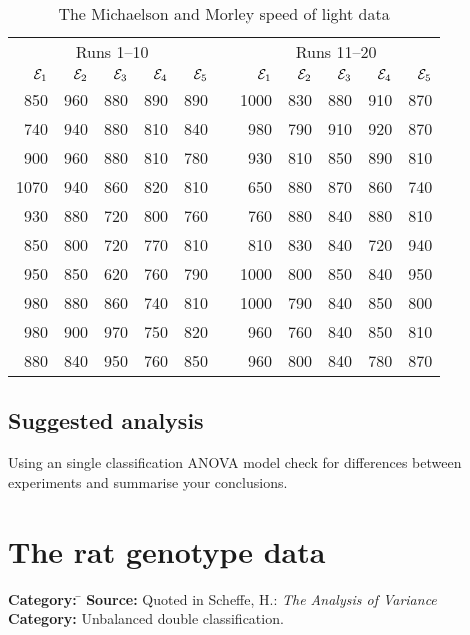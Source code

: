 \documentclass{article}
\newcommand{\strutt}{\vrule height 2.5ex depth 0.5ex width 0ex}%
\begin{document}
\begin{table}[ht]
\begin{center}
\begin{tabular}{|rrrrr|c@{\protect\strutt}|rrrrr|}
 \cline{1-5} \cline{7-11}
\multicolumn{5}{|c|}{Runs 1--10}&\hspace*{1cm}&\multicolumn{5}{c|}{Runs
11--20}\\
      ${\cal E}_1$ &    ${\cal E}_2$ &    ${\cal E}_3$ &    ${\cal E}_4$ &
      ${\cal E}_5$ &&    ${\cal E}_1$ &    ${\cal E}_2$ &    ${\cal E}_3$ &
      ${\cal E}_4$ &    ${\cal E}_5$\\
 \cline{1-5} \cline{7-11}
    850 &  960 &  880 &  890 &  890 && 1000 &  830 &  880 &  910 &  870\\
    740 &  940 &  880 &  810 &  840 && 980 &  790 &  910 &  920 &  870\\
    900 &  960 &  880 &  810 &  780 && 930 &  810 &  850 &  890 &  810\\
   1070 &  940 &  860 &  820 &  810 && 650 &  880 &  870 &  860 &  740\\
    930 &  880 &  720 &  800 &  760 && 760 &  880 &  840 &  880 &  810\\
    850 &  800 &  720 &  770 &  810 && 810 &  830 &  840 &  720 &  940\\
    950 &  850 &  620 &  760 &  790 &&1000 &  800 &  850 &  840 &  950\\
    980 &  880 &  860 &  740 &  810 &&1000 &  790 &  840 &  850 &  800\\
    980 &  900 &  970 &  750 &  820 && 960 &  760 &  840 &  850 &  810\\
    880 &  840 &  950 &  760 &  850 && 960 &  800 &  840 &  780 &  870\\
 \cline{1-5} \cline{7-11}
\end{tabular}
\end{center}

\caption{\label{morley}The Michaelson and Morley speed of light data}
\end{table}

\subsection*{Suggested analysis}
Using an single classification ANOVA model check for differences between
experiments and summarise your conclusions.

\clearpage\section{The rat genotype data}
\begin{tabbing}
\textbf{Category:} \= \kill
\textbf{Source:} \> Quoted in Scheffe, H.: \textit{The Analysis of Variance}\\
\textbf{Category:} \> Unbalanced double classification.
\end{tabbing}
\end{document}
